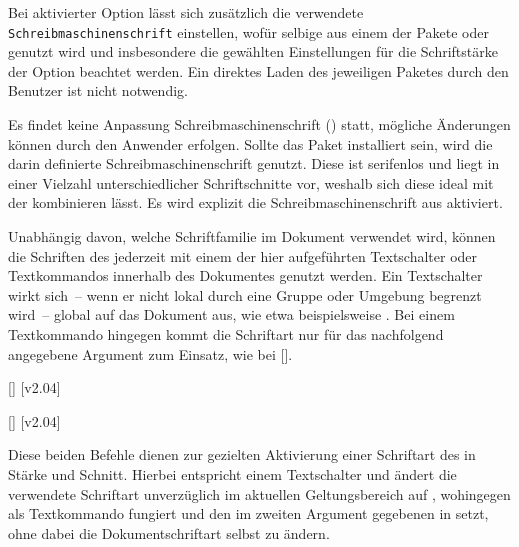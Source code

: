 \begin{DeclareEntity*}{}
\begin{DeclareEntity*}{}
\begin{DeclareEntity*}{}
\begin{Declaration}
Bei aktivierter Option  lässt sich zusätzlich die verwendete
\texttt{Schreibmaschinenschrift} einstellen, wofür selbige aus einem der Pakete 
 oder  genutzt wird und insbesondere die 
gewählten Einstellungen für die Schriftstärke der Option  
beachtet werden. Ein direktes Laden des jeweiligen Paketes durch den Benutzer 
ist nicht notwendig.
\begin{DeclareValues}
  Es findet keine Anpassung Schreibmaschinenschrift () statt, 
  mögliche Änderungen können durch den Anwender erfolgen.
  Sollte das Paket  installiert sein, wird die darin 
  definierte Schreibmaschinenschrift genutzt. Diese ist serifenlos und liegt in 
  einer Vielzahl unterschiedlicher Schriftschnitte vor, weshalb sich diese 
  ideal mit der \OpenSans kombinieren lässt.
  Es wird explizit die Schreibmaschinenschrift aus  aktiviert. 
\end{DeclareValues}
\end{Declaration}



Unabhängig davon, welche Schriftfamilie im Dokument verwendet wird, können die 
Schriften des \CDs jederzeit mit einem der hier aufgeführten Textschalter oder 
Textkommandos innerhalb des Dokumentes genutzt werden. Ein Textschalter wirkt 
sich~-- wenn er nicht lokal durch eine Gruppe oder Umgebung begrenzt wird~-- 
global auf das Dokument aus, wie etwa beispielsweise . Bei 
einem Textkommando hingegen kommt die Schriftart nur für das nachfolgend 
angegebene Argument zum Einsatz, wie bei []. 
%
\begin{Declaration}
  {[]}
  [v2.04]
\begin{Declaration}
  {[]}
  [v2.04]
\printdeclarationlist

Diese beiden Befehle dienen zur gezielten Aktivierung einer Schriftart des \CDs 
in Stärke und Schnitt. Hierbei entspricht  einem Textschalter und 
ändert die verwendete Schriftart unverzüglich im aktuellen Geltungsbereich auf 
, wohingegen  als Textkommando fungiert und den 
im zweiten Argument gegebenen  in  setzt, ohne 
dabei die Dokumentschriftart selbst zu ändern.


\end{Declaration}
\end{Declaration}
\end{DeclareEntity*}
\end{DeclareEntity*}
\end{DeclareEntity*}
